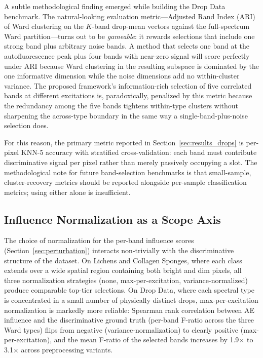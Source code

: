 A subtle methodological finding emerged while building the Drop Data benchmark.
The natural-looking evaluation metric---Adjusted Rand Index (ARI) of Ward clustering on the $K$-band drop-mean vectors against the full-spectrum Ward partition---turns out to be \emph{gameable}: it rewards selections that include one strong band plus arbitrary noise bands.
A method that selects one band at the autofluorescence peak plus four bands with near-zero signal will score perfectly under ARI because Ward clustering in the resulting subspace is dominated by the one informative dimension while the noise dimensions add no within-cluster variance.
The proposed framework's information-rich selection of five correlated bands at different excitations is, paradoxically, penalized by this metric because the redundancy among the five bands tightens within-type clusters without sharpening the across-type boundary in the same way a single-band-plus-noise selection does.

For this reason, the primary metric reported in Section~\ref{sec:results_drops} is per-pixel KNN-5 accuracy with stratified cross-validation: each band must contribute discriminative signal per pixel rather than merely passively occupying a slot.
The methodological note for future band-selection benchmarks is that small-sample, cluster-recovery metrics should be reported alongside per-sample classification metrics; using either alone is insufficient.

\subsection{Influence Normalization as a Scope Axis}
\label{sec:discussion_normalization}

The choice of normalization for the per-band influence scores (Section~\ref{sec:perturbation}) interacts non-trivially with the discriminative structure of the dataset.
On Lichens and Collagen Sponges, where each class extends over a wide spatial region containing both bright and dim pixels, all three normalization strategies (none, max-per-excitation, variance-normalized) produce comparable top-tier selections.
On Drop Data, where each spectral type is concentrated in a small number of physically distinct drops, max-per-excitation normalization is markedly more reliable: Spearman rank correlation between AE influence and the discriminative ground truth (per-band F-ratio across the three Ward types) flips from negative (variance-normalization) to clearly positive (max-per-excitation), and the mean F-ratio of the selected bands increases by 1.9$\times$ to 3.1$\times$ across preprocessing variants.

